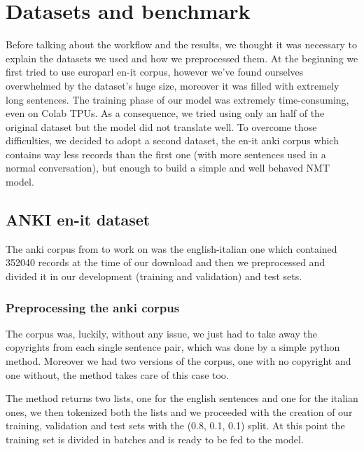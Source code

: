 \section{Datasets and benchmark}\label{sec:dataset}
Before talking about the workflow and the results, we thought it was necessary to explain the datasets we used and how we preprocessed them. At the beginning we first tried to use  europarl en-it corpus, however we've found ourselves overwhelmed by the dataset's huge size, moreover it was filled with extremely long sentences. The training phase of our model was extremely time-consuming, even on Colab TPUs. As a consequence, we tried using only an half of the original dataset but the model did not translate well. To overcome those difficulties,  we decided to adopt a second dataset, the en-it anki corpus which contains way less records than the first one (with more sentences used in a normal conversation), but enough to build a simple and well behaved NMT model.
\subsection{ANKI en-it dataset}
The anki corpus from \cite{anki_dataset} to work on was the english-italian one which contained 352040 records at the time of our download and then we preprocessed and divided it in our development (training and validation) and test sets.
\subsubsection{Preprocessing the anki corpus}
The corpus was, luckily, without any issue, we just had to take away the copyrights from each single sentence pair, which was done by a simple python method. Moreover we had two versions of the corpus, one with no copyright and one without, the method takes care of this case too.
\begin{comment}
\begin{verbatim}
def create_dataset_anki(name: str, preprocessed: bool = False):
    with open(name, encoding="UTF-8") as datafile:
        src_set = list()
        dst_set = list()
        for sentence in datafile:
            sentence = sentence.split("\t")
            src_set.append(sentence[0])
            if preprocessed:
                dst_set.append(sentence[1].split("\n")[0])
            else:
                dst_set.append(sentence[1])

    return src_set, dst_set
\end{verbatim}
\end{comment}
The method returns two lists, one for the english sentences and one for the italian ones, we then tokenized both the lists and we proceeded with the creation of our training, validation and test sets with the (0.8, 0.1, 0.1) split.
At this point the training set is divided in batches and is ready to be fed to the model.
